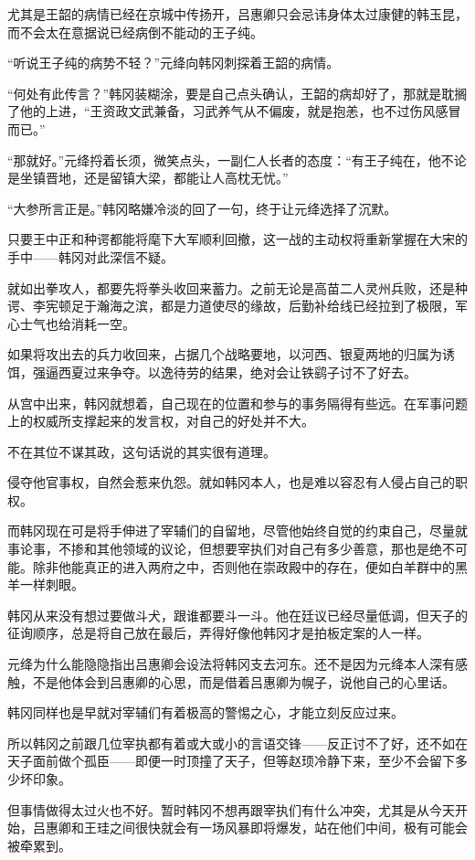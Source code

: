 尤其是王韶的病情已经在京城中传扬开，吕惠卿只会忌讳身体太过康健的韩玉昆，而不会太在意据说已经病倒不能动的王子纯。

“听说王子纯的病势不轻？”元绛向韩冈刺探着王韶的病情。

“何处有此传言？”韩冈装糊涂，要是自己点头确认，王韶的病却好了，那就是耽搁了他的上进，“王资政文武兼备，习武养气从不偏废，就是抱恙，也不过伤风感冒而已。”

“那就好。”元绛捋着长须，微笑点头，一副仁人长者的态度：“有王子纯在，他不论是坐镇晋地，还是留镇大梁，都能让人高枕无忧。”

“大参所言正是。”韩冈略嫌冷淡的回了一句，终于让元绛选择了沉默。

只要王中正和种谔都能将麾下大军顺利回撤，这一战的主动权将重新掌握在大宋的手中——韩冈对此深信不疑。

就如出拳攻人，都要先将拳头收回来蓄力。之前无论是高苗二人灵州兵败，还是种谔、李宪顿足于瀚海之滨，都是力道使尽的缘故，后勤补给线已经拉到了极限，军心士气也给消耗一空。

如果将攻出去的兵力收回来，占据几个战略要地，以河西、银夏两地的归属为诱饵，强逼西夏过来争夺。以逸待劳的结果，绝对会让铁鹞子讨不了好去。

从宫中出来，韩冈就想着，自己现在的位置和参与的事务隔得有些远。在军事问题上的权威所支撑起来的发言权，对自己的好处并不大。

不在其位不谋其政，这句话说的其实很有道理。

侵夺他官事权，自然会惹来仇怨。就如韩冈本人，也是难以容忍有人侵占自己的职权。

而韩冈现在可是将手伸进了宰辅们的自留地，尽管他始终自觉的约束自己，尽量就事论事，不掺和其他领域的议论，但想要宰执们对自己有多少善意，那也是绝不可能。除非他能真正的进入两府之中，否则他在崇政殿中的存在，便如白羊群中的黑羊一样刺眼。

韩冈从来没有想过要做斗犬，跟谁都要斗一斗。他在廷议已经尽量低调，但天子的征询顺序，总是将自己放在最后，弄得好像他韩冈才是拍板定案的人一样。

元绛为什么能隐隐指出吕惠卿会设法将韩冈支去河东。还不是因为元绛本人深有感触，不是他体会到吕惠卿的心思，而是借着吕惠卿为幌子，说他自己的心里话。

韩冈同样也是早就对宰辅们有着极高的警惕之心，才能立刻反应过来。

所以韩冈之前跟几位宰执都有着或大或小的言语交锋——反正讨不了好，还不如在天子面前做个孤臣——即便一时顶撞了天子，但等赵顼冷静下来，至少不会留下多少坏印象。

但事情做得太过火也不好。暂时韩冈不想再跟宰执们有什么冲突，尤其是从今天开始，吕惠卿和王珪之间很快就会有一场风暴即将爆发，站在他们中间，极有可能会被牵累到。

